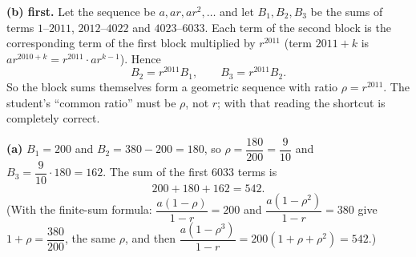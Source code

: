 \textbf{(b) first.} Let the sequence be $a,ar,ar^2,\ldots$ and let $B_1,B_2,B_3$ be the sums of terms $1$--$2011$, $2012$--$4022$ and $4023$--$6033$. Each term of the second block is the corresponding term of the first block multiplied by $r^{2011}$ (term $2011+k$ is $ar^{2010+k}=r^{2011}\cdot ar^{k-1}$). Hence
\[B_2=r^{2011}B_1,\qquad B_3=r^{2011}B_2.\]
So the block sums themselves form a geometric sequence with ratio $\rho=r^{2011}$. The student's ``common ratio'' must be $\rho$, not $r$; with that reading the shortcut is completely correct.

\textbf{(a)} $B_1=200$ and $B_2=380-200=180$, so $\rho=\dfrac{180}{200}=\dfrac{9}{10}$ and $B_3=\dfrac{9}{10}\cdot180=162$. The sum of the first $6033$ terms is
\[200+180+162=\boxed{542}.\]
(With the finite-sum formula: $\dfrac{a\left(1-\rho\right)}{1-r}=200$ and $\dfrac{a\left(1-\rho^2\right)}{1-r}=380$ give $1+\rho=\dfrac{380}{200}$, the same $\rho$, and then $\dfrac{a\left(1-\rho^3\right)}{1-r}=200\left(1+\rho+\rho^2\right)=542$.)
